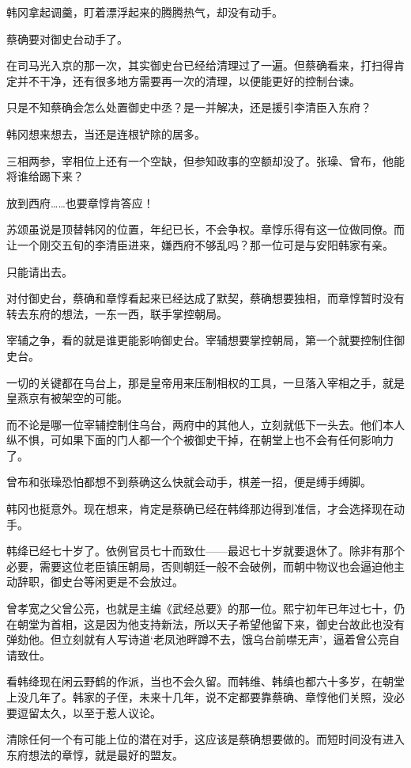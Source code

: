 韩冈拿起调羹，盯着漂浮起来的腾腾热气，却没有动手。

蔡确要对御史台动手了。

在司马光入京的那一次，其实御史台已经给清理过了一遍。但蔡确看来，打扫得肯定并不干净，还有很多地方需要再一次的清理，以便能更好的控制台谏。

只是不知蔡确会怎么处置御史中丞？是一并解决，还是援引李清臣入东府？

韩冈想来想去，当还是连根铲除的居多。

三相两参，宰相位上还有一个空缺，但参知政事的空额却没了。张璪、曾布，他能将谁给踢下来？

放到西府……也要章惇肯答应！

苏颂虽说是顶替韩冈的位置，年纪已长，不会争权。章惇乐得有这一位做同僚。而让一个刚交五旬的李清臣进来，嫌西府不够乱吗？那一位可是与安阳韩家有亲。

只能请出去。

对付御史台，蔡确和章惇看起来已经达成了默契，蔡确想要独相，而章惇暂时没有转去东府的想法，一东一西，联手掌控朝局。

宰辅之争，看的就是谁更能影响御史台。宰辅想要掌控朝局，第一个就要控制住御史台。

一切的关键都在乌台上，那是皇帝用来压制相权的工具，一旦落入宰相之手，就是皇燕京有被架空的可能。

而不论是哪一位宰辅控制住乌台，两府中的其他人，立刻就低下一头去。他们本人纵不惧，可如果下面的门人都一个个被御史干掉，在朝堂上也不会有任何影响力了。

曾布和张璪恐怕都想不到蔡确这么快就会动手，棋差一招，便是缚手缚脚。

韩冈也挺意外。现在想来，肯定是蔡确已经在韩绛那边得到准信，才会选择现在动手。

韩绛已经七十岁了。依例官员七十而致仕——最迟七十岁就要退休了。除非有那个必要，需要这位老臣镇压朝局，否则朝廷一般不会破例，而朝中物议也会逼迫他主动辞职，御史台等闲更是不会放过。

曾孝宽之父曾公亮，也就是主编《武经总要》的那一位。熙宁初年已年过七十，仍在朝堂为首相，这是因为他支持新法，所以天子希望他留下来，御史台故此也没有弹劾他。但立刻就有人写诗道‘老凤池畔蹲不去，饿乌台前噤无声’，逼着曾公亮自请致仕。

看韩绛现在闲云野鹤的作派，当也不会久留。而韩维、韩缜也都六十多岁，在朝堂上没几年了。韩家的子侄，未来十几年，说不定都要靠蔡确、章惇他们关照，没必要逗留太久，以至于惹人议论。

清除任何一个有可能上位的潜在对手，这应该是蔡确想要做的。而短时间没有进入东府想法的章惇，就是最好的盟友。

